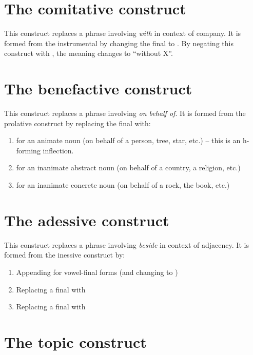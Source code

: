 \documentclass{book}
\begin{document}
\section{The comitative construct}

This construct replaces a phrase involving  \emph{with} in context of company. It is formed from the instrumental by changing the final  to . By negating this construct with , the meaning changes to ``without X''.

\section{The benefactive construct}

This construct replaces a phrase involving  \emph{on behalf of}. It is formed from the prolative construct by replacing the final  with:

\begin{enumerate}
  \item {} for an animate noun (on behalf of a person, tree, star, etc.) -- this is an h-forming inflection.
  \item {} for an inanimate abstract noun (on behalf of a country, a religion, etc.)
  \item {} for an inanimate concrete noun (on behalf of a rock, the book, etc.)
\end{enumerate}

\section{The adessive construct}

This construct replaces a phrase involving  \emph{beside} in context of adjacency. It is formed from the inessive construct by:

\begin{enumerate}
	\item Appending  for vowel-final forms (and changing  to )
	\item Replacing a final  with 
	\item Replacing a final  with 
\end{enumerate}

\section{The topic construct}
\end{document}
